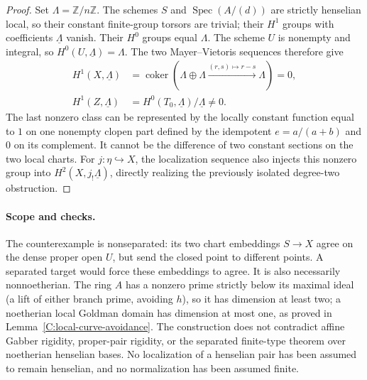 \begin{proof}
Set $\Lambda=\mathbb Z/n\mathbb Z$. The schemes $S$ and
$\operatorname{Spec}(A/(d))$ are strictly henselian local, so
their constant finite-group torsors are trivial; their $H^1$
groups with coefficients $\underline\Lambda$ vanish. Their
$H^0$ groups equal $\Lambda$. The scheme $U$ is nonempty and
integral, so $H^0(U,\underline\Lambda)=\Lambda$. The two
Mayer--Vietoris sequences therefore give
\[
\begin{split}
 H^1(X,\underline\Lambda)&=
  \operatorname{coker}(\Lambda\oplus\Lambda
    \xrightarrow{(r,s)\mapsto r-s}\Lambda)=0,\\
 H^1(Z,\underline\Lambda)&=
  H^0(T_0,\underline\Lambda)/\underline\Lambda\ne0.
\end{split}
\]
The last nonzero class can be represented by the locally constant
function equal to $1$ on one nonempty clopen part defined by the
idempotent $e=a/(a+b)$ and $0$ on its complement. It cannot be
the difference of two constant sections on the two local charts.
For $j:\eta\hookrightarrow X$, the localization sequence also
injects this nonzero group into
$H^2(X,j_!\underline\Lambda)$, directly realizing the previously
isolated degree-two obstruction.
\end{proof}

\paragraph{Scope and checks.}
The counterexample is nonseparated: its two chart embeddings
$S\to X$ agree on the dense proper open $U$, but send the closed
point to different points. A separated target would force these
embeddings to agree. It is also necessarily nonnoetherian.
The ring $A$ has a nonzero prime strictly below its maximal ideal
(a lift of either branch prime, avoiding $h$), so it has dimension
at least two; a noetherian local Goldman domain has dimension at
most one, as proved in Lemma~\ref{C:local-curve-avoidance}.
The construction does not contradict affine Gabber rigidity,
proper-pair rigidity, or the separated finite-type theorem over
noetherian henselian bases. No localization of a henselian pair
has been assumed to remain henselian, and no normalization has
been assumed finite.


